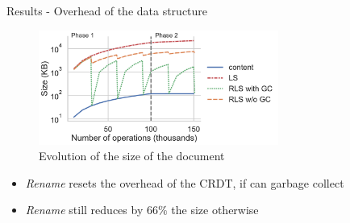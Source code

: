 \documentclass[10pt]{beamer}
\begin{document}
\begin{frame}{Results - Overhead of the data structure}
  \begin{figure}
    \centering
    \includegraphics[width=0.7\textwidth]{img/snapshots-sizes.pdf}
    \caption{Evolution of the size of the document}
    \label{fig:evolution-document-size}
  \end{figure}

  \vspace{-1\baselineskip}
  \begin{itemize}
    \item \emph{Rename} resets the overhead of the CRDT, if can garbage collect
    \item \emph{Rename} still reduces by $66\%$ the size otherwise
  \end{itemize}
\end{frame}
\end{document}
